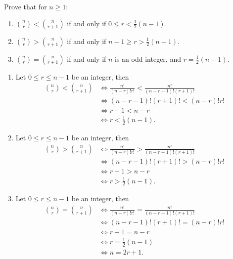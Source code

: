 \begin{exercise}
    Prove that for $n \geq 1$:
    \begin{enumerate}
        \item $\displaystyle \binom{n }{r } < \binom{n }{r+1}$ if and only if $0 \leq r < \displaystyle \frac{1}{2}(n-1)$.
        \item $\displaystyle \binom{n }{ r} > \binom{n }{r+1}$ if and only if $n-1 \geq r > \displaystyle \frac{1}{2}(n-1)$.
        \item $\displaystyle \binom{n }{r } = \binom{n }{r+1 }$ if and only if $n$ is an odd integer, and $\displaystyle r = \frac{1}{2}(n-1)$.
    \end{enumerate}
\end{exercise}

\begin{solution}
    \begin{enumerate}
        \item Let $0 \leq r \leq n-1$ be an integer, then
        \begin{align*}
            \binom{n }{r } < \binom{n }{r+1} &\iff \frac{n!}{(n-r)! r!} < \frac{n!}{(n-r - 1)! (r+1)!} \\
            &\iff (n-r - 1)! (r+1)! < (n-r)! r! \\
            &\iff r+1 < n-r \\
            &\iff r < \frac{1}{2}(n-1).
        \end{align*}
        \item Let $0 \leq r \leq n-1$ be an integer, then
        \begin{align*}
            \binom{n }{r } > \binom{n }{r+1} &\iff \frac{n!}{(n-r)! r!} > \frac{n!}{(n-r - 1)! (r+1)!} \\
            &\iff (n-r - 1)! (r+1)! > (n-r)! r! \\
            &\iff r+1 > n-r \\
            &\iff r > \frac{1}{2}(n-1).
        \end{align*}
        \item Let $0 \leq r \leq n-1$ be an integer, then
        \begin{align*}
            \binom{n }{r } = \binom{n }{r+1} &\iff \frac{n!}{(n-r)! r!} = \frac{n!}{(n-r - 1)! (r+1)!} \\
            &\iff (n-r - 1)! (r+1)! = (n-r)! r! \\
            &\iff r+1 = n-r \\
            &\iff r = \frac{1}{2}(n-1) \\
            &\iff n = 2r+1.
        \end{align*}
    \end{enumerate}
\end{solution}

